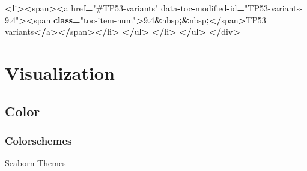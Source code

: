 \documentclass[]{book}
\newenvironment{Shaded}{\begin{snugshade}}{\end{snugshade}}
\newcommand{\BuiltInTok}[1]{#1}
\newcommand{\FloatTok}[1]{\textcolor[rgb]{0.00,0.00,0.81}{#1}}
\newcommand{\KeywordTok}[1]{\textcolor[rgb]{0.13,0.29,0.53}{\textbf{#1}}}
\newcommand{\NormalTok}[1]{#1}
\newcommand{\OperatorTok}[1]{\textcolor[rgb]{0.81,0.36,0.00}{\textbf{#1}}}
\newcommand{\StringTok}[1]{\textcolor[rgb]{0.31,0.60,0.02}{#1}}
\begin{document}
\begin{Shaded}
\begin{Highlighting}[]
        \OperatorTok{<}\NormalTok{li}\OperatorTok{><}\NormalTok{span}\OperatorTok{><}\NormalTok{a href}\OperatorTok{=}\StringTok{"#TP53-variants"}\NormalTok{ data}\OperatorTok{-}\NormalTok{toc}\OperatorTok{-}\NormalTok{modified}\OperatorTok{-}\BuiltInTok{id}\OperatorTok{=}\StringTok{"TP53-variants-9.4"}\OperatorTok{><}\NormalTok{span }\KeywordTok{class}\OperatorTok{=}\StringTok{"toc-item-num"}\OperatorTok{>}\FloatTok{9.4}\OperatorTok{&}\NormalTok{nbsp}\OperatorTok{;&}\NormalTok{nbsp}\OperatorTok{;</}\NormalTok{span}\OperatorTok{>}\NormalTok{TP53 variants}\OperatorTok{</}\NormalTok{a}\OperatorTok{></}\NormalTok{span}\OperatorTok{></}\NormalTok{li}\OperatorTok{>}
        \OperatorTok{</}\NormalTok{ul}\OperatorTok{>}
        \OperatorTok{</}\NormalTok{li}\OperatorTok{>}
    \OperatorTok{</}\NormalTok{ul}\OperatorTok{>}
\OperatorTok{</}\NormalTok{div}\OperatorTok{>}
\end{Highlighting}
\end{Shaded}

\hypertarget{visualization}{%
\chapter{Visualization}\label{visualization}}

\hypertarget{color}{%
\section{Color}\label{color}}

\hypertarget{colorschemes}{%
\subsection{Colorschemes}\label{colorschemes}}

Seaborn Themes

\begin{Shaded}
\end{Shaded}
\end{document}
